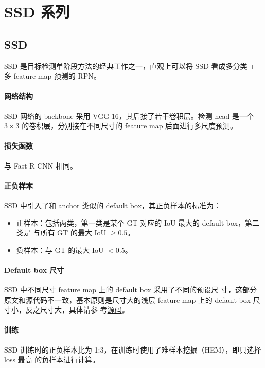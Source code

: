 \section{SSD 系列}
\label{sec:SSD}

\subsection{SSD}
\label{subsec:SSD}

SSD 是目标检测单阶段方法的经典工作之一，直观上可以将 SSD 看成多分类 + 多 feature
map 预测的 RPN\cite{2015-SSD}。

\paragraph{网络结构}
SSD 网络的 backbone 采用 VGG-16，其后接了若干卷积层。检测 head 是一个 $3 \times
3$ 的卷积层，分别接在不同尺寸的 feature map 后面进行多尺度预测。

\paragraph{损失函数}
与 Fast R-CNN 相同。

\paragraph{正负样本}
SSD 中引入了和 anchor 类似的 default box，其正负样本的标准为：

\begin{itemize}
  \item 正样本：包括两类，第一类是某个 GT 对应的 IoU 最大的 default box，第二类是
    与所有 GT 的最大 IoU $ \geq 0.5 $。
  \item 负样本：与 GT 的最大 IoU $ < 0.5 $。
\end{itemize}

\paragraph{Default box 尺寸}
SSD 中不同尺寸 feature map 上的 default box 采用了不同的预设尺
寸，这部分原文和源代码不一致，基本原则是尺寸大的浅层 feature map 上的 default
box 尺寸小，反之尺寸大，具体请参
考\href{https://github.com/weiliu89/caffe/blob/ssd/examples/ssd/ssd_pascal.py}{源码}。

\paragraph{训练}
SSD 训练时的正负样本比为 1:3，在训练时使用了难样本挖掘（HEM），即只选择 loss 最高
的负样本进行计算。

